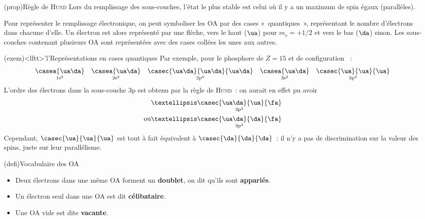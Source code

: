 \documentclass[../../main/main.tex]{subfiles}
\begin{document}
\begin{tcb*}(prop){Règle de \textsc{Hund}}
	Lors du remplissage des sous-couches, l'état le plus stable est
	celui où il y a un maximum de spin égaux (parallèles).
\end{tcb*}

Pour représenter le remplissage électronique, on peut symboliser les OA par des
cases «~quantiques~», représentant le nombre d'électrons dans chacune d'elle. Un
électron est alors représenté par une flèche, vers le haut ($\ua$) pour $m_s =
	+1/2$ et vers le bas ($\da$) sinon. Les sous-couches contenant plusieurs OA sont
représentées avec des cases collées les unes aux autres.

\begin{tcb*}(exem)<lftt>'l'{Représentations en cases quantiques}
	Par exemple, pour le phosphore de $Z=15$ et de configuration ~:
	\[
		\underset{\rm 1s^2}{\casea{\ua\da}}
		\quad
		\underset{\rm 2s^2}{\casea{\ua\da}}
		\quad
		\underset{\rm 2p^6}{\casec{\ua\da}{\ua\da}{\ua\da}}
		\quad
		\underset{\rm 3s^2}{\casea{\ua\da}}
		\quad
		\underset{\rm 3p^3}{\casec{\ua}{\ua}{\ua}}
	\]
	L'ordre des électrons dans la sous-couche 3p est obtenu par la règle de
	\textsc{Hund}~: on aurait en effet pu avoir
	\begin{align*}
		 & … \underset{\rm 3p^3}{\casec{\ua\da}{\ua}{\fa}}
		\\\text{ou}
		 & … \underset{\rm 3p^3}{\casec{\ua\da}{\da}{\fa}}
	\end{align*}
	Cependant, $\casec{\ua}{\ua}{\ua}$ est tout à fait équivalent à
	$\casec{\da}{\da}{\da}$~: il n'y a pas de discrimination sur la valeur des
	spins, juste sur leur parallélisme.
\end{tcb*}


\begin{tcb*}(defi){Vocabulaire des OA}
	\begin{itemize}[label=$\diamond$, leftmargin=20pt]
		\item Deux électrons dans une même OA forment un \textbf{doublet}, on
		      dit qu'ils sont \textbf{appariés}.
		\item Un électron seul dans une OA est dit \textbf{célibataire}.
		\item Une OA vide est dite \textbf{vacante}.
	\end{itemize}
\end{tcb*}
\end{document}
